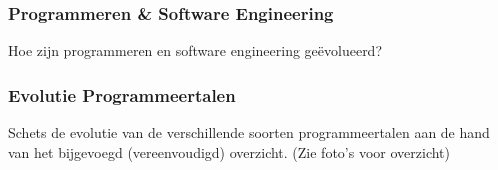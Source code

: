 \documentclass[../main.tex]{subfiles}
\begin{document}
\subsubsection{Programmeren \& Software Engineering}
\begin{question}
Hoe zijn programmeren en software engineering geëvolueerd?
\end{question}

\subsubsection{Evolutie Programmeertalen}
\begin{question}
Schets de evolutie van de verschillende soorten programmeertalen aan de hand van het bijgevoegd (vereenvoudigd) overzicht. (Zie foto's voor overzicht)
\end{question}
\end{document}
